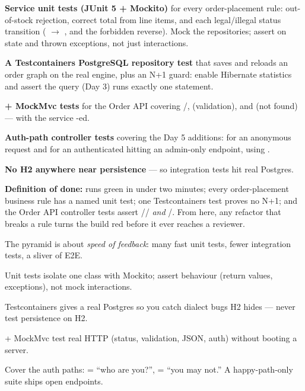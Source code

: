 \begin{buildalong}
\begin{wbitem}
  \item \textbf{Service unit tests (JUnit 5 + Mockito)} for every order-placement rule: out-of-stock rejection, correct total from line items, and each legal/illegal status transition ( $\rightarrow$ , and the forbidden reverse). Mock the repositories; assert on state and thrown exceptions, not just interactions.
  \item \textbf{A Testcontainers PostgreSQL repository test} that saves and reloads an order graph on the real engine, plus an N+1 guard: enable Hibernate statistics and assert the  query (Day 3) runs exactly one statement.
  \item \textbf{ + MockMvc tests} for the Order API covering /,  (validation), and  (not found) --- with the service -ed.
  \item \textbf{Auth-path controller tests} covering the Day 5 additions:  for an anonymous request and  for an authenticated  hitting an admin-only endpoint, using .
  \item \textbf{No H2 anywhere near persistence} ---  so integration tests hit real Postgres.
\end{wbitem}
\smallskip\textbf{Definition of done:}  runs green in under two minutes; every order-placement business rule has a named unit test; one Testcontainers test proves no N+1; and the Order API controller tests assert // \emph{and} /. From here, any refactor that breaks a rule turns the build red before it ever reaches a reviewer.
\end{buildalong}


\begin{tickcheck}
  \item The pyramid is about \emph{speed of feedback}: many fast unit tests, fewer integration tests, a sliver of E2E.
  \item Unit tests isolate one class with Mockito; assert behaviour (return values, exceptions), not mock interactions.
  \item Testcontainers gives a real Postgres so you catch dialect bugs H2 hides --- never test persistence on H2.
  \item {} + MockMvc test real HTTP (status, validation, JSON, auth) without booting a server.
  \item Cover the auth paths:  = ``who are you?'',  = ``you may not.'' A happy-path-only suite ships open endpoints.
\end{tickcheck}


